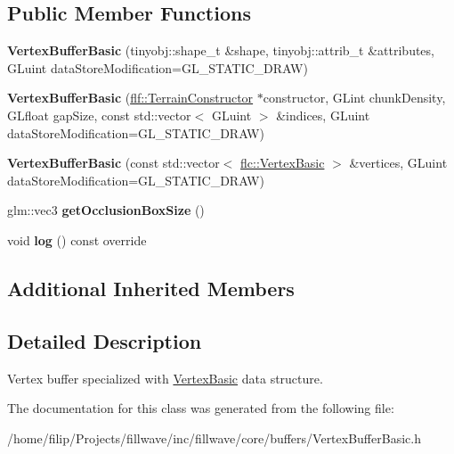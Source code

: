 \subsection*{Public Member Functions}
\begin{DoxyCompactItemize}
\item 
{\bfseries Vertex\+Buffer\+Basic} (tinyobj\+::shape\+\_\+t \&shape, tinyobj\+::attrib\+\_\+t \&attributes, G\+Luint data\+Store\+Modification=G\+L\+\_\+\+S\+T\+A\+T\+I\+C\+\_\+\+D\+R\+AW)\hypertarget{classflw_1_1flc_1_1VertexBufferBasic_a6346c0baef0d0343abe53d8ab27df56e}{}\label{classflw_1_1flc_1_1VertexBufferBasic_a6346c0baef0d0343abe53d8ab27df56e}

\item 
{\bfseries Vertex\+Buffer\+Basic} (\hyperlink{classflw_1_1flf_1_1TerrainConstructor}{flf\+::\+Terrain\+Constructor} $\ast$constructor, G\+Lint chunk\+Density, G\+Lfloat gap\+Size, const std\+::vector$<$ G\+Luint $>$ \&indices, G\+Luint data\+Store\+Modification=G\+L\+\_\+\+S\+T\+A\+T\+I\+C\+\_\+\+D\+R\+AW)\hypertarget{classflw_1_1flc_1_1VertexBufferBasic_aeb237a322d04b866e052eea5adf8ae41}{}\label{classflw_1_1flc_1_1VertexBufferBasic_aeb237a322d04b866e052eea5adf8ae41}

\item 
{\bfseries Vertex\+Buffer\+Basic} (const std\+::vector$<$ \hyperlink{structflw_1_1flc_1_1VertexBasic}{flc\+::\+Vertex\+Basic} $>$ \&vertices, G\+Luint data\+Store\+Modification=G\+L\+\_\+\+S\+T\+A\+T\+I\+C\+\_\+\+D\+R\+AW)\hypertarget{classflw_1_1flc_1_1VertexBufferBasic_af30ad7addc62d33614eaf0cb255d6b38}{}\label{classflw_1_1flc_1_1VertexBufferBasic_af30ad7addc62d33614eaf0cb255d6b38}

\item 
glm\+::vec3 {\bfseries get\+Occlusion\+Box\+Size} ()\hypertarget{classflw_1_1flc_1_1VertexBufferBasic_a6d2fb7d63312cd32469d532868ee3a7e}{}\label{classflw_1_1flc_1_1VertexBufferBasic_a6d2fb7d63312cd32469d532868ee3a7e}

\item 
void {\bfseries log} () const override\hypertarget{classflw_1_1flc_1_1VertexBufferBasic_adf1c830a71de6eaffae22c204bfde3b6}{}\label{classflw_1_1flc_1_1VertexBufferBasic_adf1c830a71de6eaffae22c204bfde3b6}

\end{DoxyCompactItemize}
\subsection*{Additional Inherited Members}


\subsection{Detailed Description}
Vertex buffer specialized with \hyperlink{structflw_1_1flc_1_1VertexBasic}{Vertex\+Basic} data structure. 

The documentation for this class was generated from the following file\+:\begin{DoxyCompactItemize}
\item 
/home/filip/\+Projects/fillwave/inc/fillwave/core/buffers/Vertex\+Buffer\+Basic.\+h\end{DoxyCompactItemize}
